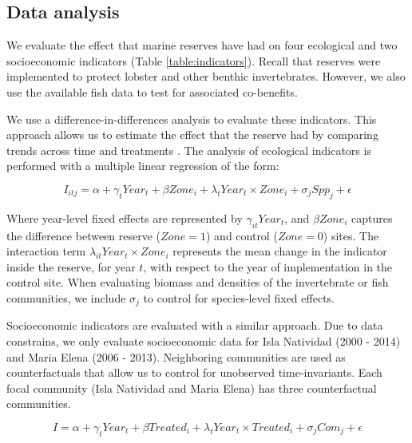 \documentclass{frontiersSCNS}
\begin{document}
\subsection{Data analysis}\label{data-analysis}

We evaluate the effect that marine reserves have had on four ecological
and two socioeconomic indicators (Table \ref{table:indicators}). Recall
that reserves were implemented to protect lobster and other benthic
invertebrates. However, we also use the available fish data to test for
associated co-benefits.

We use a difference-in-differences analysis to evaluate these
indicators. This approach allows us to estimate the effect that the
reserve had by comparing trends across time and treatments
\citep{moland_2013-VP,Villasenor-Derbez_2018}. The analysis of
ecological indicators is performed with a multiple linear regression of
the form:

\begin{equation}
I_{itj} = \alpha + \gamma_{t} Year_t + \beta Zone_i + \lambda_{t} Year_t\times Zone_i + \sigma_jSpp_j + \epsilon
\label{eqn:reg_bio}
\end{equation}

Where year-level fixed effects are represented by
\(\gamma_{it} Year_t\), and \(\beta Zone_i\) captures the difference
between reserve (\(Zone = 1\)) and control (\(Zone = 0\)) sites. The
interaction term \(\lambda_{it} Year_t\times Zone_i\) represents the
mean change in the indicator inside the reserve, for year \(t\), with
respect to the year of implementation in the control site. When
evaluating biomass and densities of the invertebrate or fish
communities, we include \(\sigma_j\) to control for species-level fixed
effects.

Socioeconomic indicators are evaluated with a similar approach. Due to
data constrains, we only evaluate socioeconomic data for Isla Natividad
(2000 - 2014) and Maria Elena (2006 - 2013). Neighboring communities are
used as counterfactuals that allow us to control for unobserved
time-invariants. Each focal community (Isla Natividad and Maria Elena)
has three counterfactual communities.

\begin{equation}
I = \alpha + \gamma_{t} Year_t + \beta Treated_i + \lambda_{t} Year_t\times Treated_i + \sigma_jCom_j +\epsilon
\label{eqn:soc_reg}
\end{equation}
\end{document}
